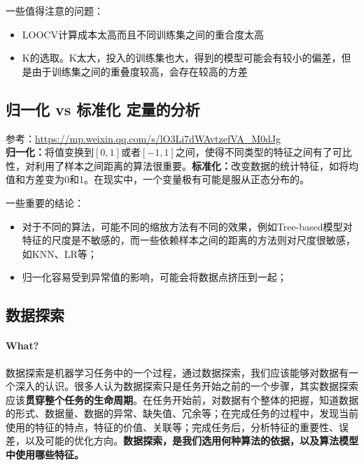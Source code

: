 一些值得注意的问题：
\begin{itemize}
	\item LOOCV计算成本太高而且不同训练集之间的重合度太高
	\item K的选取。K太大，投入的训练集也大，得到的模型可能会有较小的偏差，但是由于训练集之间的重叠度较高，会存在较高的方差
\end{itemize}

\subsection{归一化 vs 标准化 定量的分析}
参考：\href{https://mp.weixin.qq.com/s/lO3Li7dWAvtzefVA_M0dJg}{https://mp.weixin.qq.com/s/lO3Li7dWAvtzefVA\_M0dJg}\\
\textbf{归一化：}将值变换到$[0, 1]$或者$[-1, 1]$之间，使得不同类型的特征之间有了可比性，对利用了样本之间距离的算法很重要。\textbf{标准化：}改变数据的统计特征，如将均值和方差变为0和1。在现实中，一个变量极有可能是服从正态分布的。


一些重要的结论：
\begin{itemize}
	\item 对于不同的算法，可能不同的缩放方法有不同的效果，例如Tree-based模型对特征的尺度是不敏感的，而一些依赖样本之间的距离的方法则对尺度很敏感，如KNN、LR等；
	\item 归一化容易受到异常值的影响，可能会将数据点挤压到一起；
\end{itemize}

\subsection{数据探索}
\paragraph{What?}数据探索是机器学习任务中的一个过程，通过数据探索，我们应该能够对数据有一个深入的认识。很多人认为数据探索只是任务开始之前的一个步骤，其实数据探索应该\textbf{贯穿整个任务的生命周期}。在任务开始前，对数据有个整体的把握，知道数据的形式、数据量、数据的异常、缺失值、冗余等；在完成任务的过程中，发现当前使用的特征的特点，特征的价值、关联等；完成任务后，分析特征的重要性、误差，以及可能的优化方向。\textbf{数据探索，是我们选用何种算法的依据，以及算法模型中使用哪些特征。}

